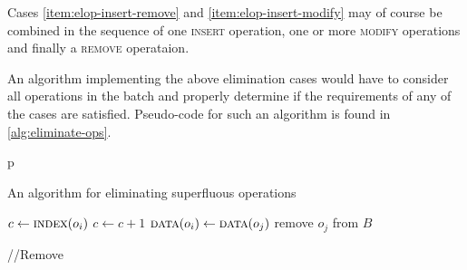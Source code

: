 Cases \ref{item:elop-insert-remove} and \ref{item:elop-insert-modify} may of
course be combined in the sequence of one \textsc{insert} operation, one or more
\textsc{modify} operations and finally a \textsc{remove} operataion.

An algorithm implementing the above elimination cases would have to consider all
operations in the batch and properly determine if the requirements of any of the
cases are satisfied. Pseudo-code for such an algorithm is found in
\ref{alg:eliminate-ops}.

\begin{algorithm}{p}
  \caption{An algorithm for eliminating superfluous operations}
  \label{alg:eliminate-ops}
  \begin{algorithmic}
        \State $c\gets\textsc{index}(o_i)$
                  \State $c \gets c+1$
                \EndIf
              \EndCase
                  \State $\textsc{data}(o_i) \gets \textsc{data}(o_j)$
                  \State remove $o_j$ from $B$
                \EndIf
              \EndCase
                    
                  \Else //Remove
                  
                  \EndIf
                \EndIf
              \EndCase
              
          \EndSwitch
          \EndFor
        \EndIf
      \EndFor
    \EndProcedure
  \end{algorithmic}
\end{algorithm}
 
